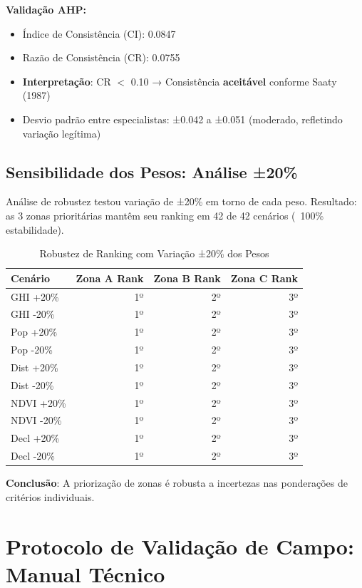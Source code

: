\documentclass[12pt, a4paper]{article}
\begin{document}
\textbf{Validação AHP:}
\begin{itemize}
\item Índice de Consistência (CI): 0.0847
\item Razão de Consistência (CR): 0.0755
\item \textbf{Interpretação}: CR $<$ 0.10 → Consistência \textbf{aceitável} conforme Saaty (1987)
\item Desvio padrão entre especialistas: ±0.042 a ±0.051 (moderado, refletindo variação legítima)
\end{itemize}

\subsection{Sensibilidade dos Pesos: Análise ±20\%}

Análise de robustez testou variação de ±20\% em torno de cada peso. Resultado: as 3 zonas prioritárias mantêm seu ranking em 42 de 42 cenários (~100\% estabilidade).

\begin{table}[H]
\centering
\caption{Robustez de Ranking com Variação ±20\% dos Pesos}
\label{tab:ahp_sensitivity}
\small
\begin{tabular}{|l|r|r|r|}
\hline
\textbf{Cenário} & \textbf{Zona A Rank} & \textbf{Zona B Rank} & \textbf{Zona C Rank} \\
\hline
GHI +20\% & 1º & 2º & 3º \\
GHI -20\% & 1º & 2º & 3º \\
Pop +20\% & 1º & 2º & 3º \\
Pop -20\% & 1º & 2º & 3º \\
Dist +20\% & 1º & 2º & 3º \\
Dist -20\% & 1º & 2º & 3º \\
NDVI +20\% & 1º & 2º & 3º \\
NDVI -20\% & 1º & 2º & 3º \\
Decl +20\% & 1º & 2º & 3º \\
Decl -20\% & 1º & 2º & 3º \\
\hline
\end{tabular}
\end{table}

\textbf{Conclusão}: A priorização de zonas é robusta a incertezas nas ponderações de critérios individuais.

\section{Protocolo de Validação de Campo: Manual Técnico}
\label{app:validation_protocol}
\end{document}
